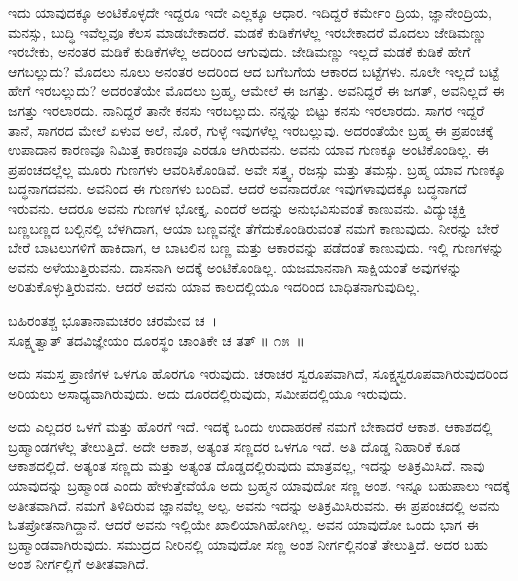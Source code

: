 ಇದು ಯಾವುದಕ್ಕೂ ಅಂಟಿಕೊಳ್ಳದೇ ಇದ್ದರೂ ಇದೇ ಎಲ್ಲಕ್ಕೂ ಆಧಾರ. ಇದಿದ್ದರೆ ಕರ್ಮೇಂ ದ್ರಿಯ, ಜ್ಞಾನೇಂದ್ರಿಯ, ಮನಸ್ಸು, ಬುದ್ಧಿ ಇವೆಲ್ಲವೂ ಕೆಲಸ ಮಾಡಬೇಕಾದರೆ. ಮಡಕೆ ಕುಡಿಕೆಗಳೆಲ್ಲ ಇರಬೇಕಾದರೆ ಮೊದಲು ಜೇಡಿಮಣ್ಣು ಇರಬೇಕು, ಅನಂತರ ಮಡಿಕೆ ಕುಡಿಕೆಗಳೆಲ್ಲ ಅದರಿಂದ ಆಗುವುದು. ಜೇಡಿಮಣ್ಣು ಇಲ್ಲದೆ ಮಡಕೆ ಕುಡಿಕೆ ಹೇಗೆ ಆಗಬಲ್ಲುದು? ಮೊದಲು ನೂಲು ಅನಂತರ ಅದರಿಂದ ಆದ ಬಗೆಬಗೆಯ ಆಕಾರದ ಬಟ್ಟೆಗಳು. ನೂಲೇ ಇಲ್ಲದೆ ಬಟ್ಟೆ ಹೇಗೆ ಇರಬಲ್ಲುದು? ಅದರಂತೆಯೇ ಮೊದಲು ಬ್ರಹ್ಮ, ಆಮೇಲೆ ಈ ಜಗತ್ತು. ಅವನಿದ್ದರೆ ಈ ಜಗತ್, ಅವನಿಲ್ಲದೆ ಈ ಜಗತ್ತು ಇರಲಾರದು. ನಾನಿದ್ದರೆ ತಾನೇ ಕನಸು ಇರಬಲ್ಲುದು. ನನ್ನನ್ನು ಬಿಟ್ಟು ಕನಸು ಇರಲಾರದು. ಸಾಗರ ಇದ್ದರೆ ತಾನೆ, ಸಾಗರದ ಮೇಲೆ ಏಳುವ ಅಲೆ, ನೊರೆ, ಗುಳ್ಳೆ ಇವುಗಳೆಲ್ಲ ಇರಬಲ್ಲುವು. ಅದರಂತೆಯೇ ಬ್ರಹ್ಮ ಈ ಪ್ರಪಂಚಕ್ಕೆ ಉಪಾದಾನ ಕಾರಣವೂ ನಿಮಿತ್ತ ಕಾರಣವೂ ಎರಡೂ ಆಗಿರುವನು. ಅವನು ಯಾವ ಗುಣಕ್ಕೂ ಅಂಟಿಕೊಂಡಿಲ್ಲ. ಈ ಪ್ರಪಂಚದಲ್ಲೆಲ್ಲ ಮೂರು ಗುಣಗಳು ಆವರಿಸಿಕೊಂಡಿವೆ. ಅವೇ ಸತ್ತ್ವ, ರಜಸ್ಸು ಮತ್ತು ತಮಸ್ಸು. ಬ್ರಹ್ಮ ಯಾವ ಗುಣಕ್ಕೂ ಬದ್ಧನಾಗದವನು. ಅವನಿಂದ ಈ ಗುಣಗಳು ಬಂದಿವೆ. ಆದರೆ ಅವನಾದರೋ ಇವುಗಳಾವುದಕ್ಕೂ ಬದ್ಧನಾಗದೆ ಇರುವನು. ಆದರೂ ಅವನು ಗುಣಗಳ ಭೋಕ್ತೃ. ಎಂದರೆ ಅದನ್ನು ಅನುಭವಿಸುವಂತೆ ಕಾಣುವನು. ವಿದ್ಯುಚ್ಛಕ್ತಿ ಬಣ್ಣಬಣ್ಣದ ಬಲ್ಬಿನಲ್ಲಿ ಬೆಳಗಿದಾಗ, ಆಯಾ ಬಣ್ಣವನ್ನೇ ತೆಗೆದುಕೊಂಡಿರುವಂತೆ ನಮಗೆ ಕಾಣುವುದು. ನೀರನ್ನು ಬೇರೆ ಬೇರೆ ಬಾಟಲುಗಳಿಗೆ ಹಾಕಿದಾಗ, ಆ ಬಾಟಲಿನ ಬಣ್ಣ ಮತ್ತು ಆಕಾರವನ್ನು ಪಡೆದಂತೆ ಕಾಣುವುದು. ಇಲ್ಲಿ ಗುಣಗಳನ್ನು ಅವನು ಅಳೆಯುತ್ತಿರುವನು. ದಾಸನಾಗಿ ಅದಕ್ಕೆ ಅಂಟಿಕೊಂಡಿಲ್ಲ. ಯಜಮಾನನಾಗಿ ಸಾಕ್ಷಿಯಂತೆ ಅವುಗಳನ್ನು ಅರಿತುಕೊಳ್ಳುತ್ತಿರುವನು. ಆದರೆ ಅವನು ಯಾವ ಕಾಲದಲ್ಲಿಯೂ ಇದರಿಂದ ಬಾಧಿತನಾಗುವುದಿಲ್ಲ.

\begin{shloka}
ಬಹಿರಂತಶ್ಚ ಭೂತಾನಾಮಚರಂ ಚರಮೇವ ಚ~।\\ಸೂಕ್ಷ್ಮತ್ವಾತ್ ತದವಿಜ್ಞೇಯಂ ದೂರಸ್ಥಂ ಚಾಂತಿಕೇ ಚ ತತ್ \hfill॥ ೧೫~॥
\end{shloka}

\begin{artha}
ಅದು ಸಮಸ್ತ ಪ್ರಾಣಿಗಳ ಒಳಗೂ ಹೊರಗೂ ಇರುವುದು. ಚರಾಚರ ಸ್ವರೂಪವಾಗಿದೆ, ಸೂಕ್ಷ್ಮ\-ಸ್ವರೂಪ\-ವಾಗಿರುವುದರಿಂದ ಅರಿಯಲು ಅಸಾಧ್ಯವಾಗಿರುವುದು. ಅದು ದೂರದಲ್ಲಿರುವುದು, ಸಮೀಪ\-ದಲ್ಲಿಯೂ ಇರುವುದು.
\end{artha}

ಅದು ಎಲ್ಲದರ ಒಳಗೆ ಮತ್ತು ಹೊರಗೆ ಇದೆ. ಇದಕ್ಕೆ ಒಂದು ಉದಾಹರಣೆ ನಮಗೆ ಬೇಕಾದರೆ ಆಕಾಶ. ಆಕಾಶದಲ್ಲಿ ಬ್ರಹ್ಮಾಂಡಗಳೆಲ್ಲ ತೇಲುತ್ತಿದೆ. ಅದೇ ಆಕಾಶ, ಅತ್ಯಂತ ಸಣ್ಣದರ ಒಳಗೂ ಇದೆ. ಅತಿ ದೊಡ್ಡ ನಿಹಾರಿಕೆ ಕೂಡ ಆಕಾಶದಲ್ಲಿದೆ. ಅತ್ಯಂತ ಸಣ್ಣದು ಮತ್ತು ಅತ್ಯಂತ ದೊಡ್ಡದಲ್ಲಿರುವುದು ಮಾತ್ರವಲ್ಲ, ಇದನ್ನು ಅತಿಕ್ರಮಿಸಿದೆ. ನಾವು ಯಾವುದನ್ನು ಬ್ರಹ್ಮಾಂಡ ಎಂದು ಹೇಳುತ್ತೇವೆಯೊ ಅದು ಬ್ರಹ್ಮನ ಯಾವುದೋ ಸಣ್ಣ ಅಂಶ. ಇನ್ನೂ ಬಹುಪಾಲು ಇದಕ್ಕೆ ಅತೀತವಾಗಿದೆ. ನಮಗೆ ತಿಳಿದಿರುವ ಜ್ಞಾನವೆಲ್ಲ ಅಲ್ಪ. ಅವನು ಇದನ್ನು ಅತಿಕ್ರಮಿಸಿರುವನು. ಈ ಪ್ರಪಂಚದಲ್ಲಿ ಅವನು ಓತಪ್ರೋತನಾಗಿದ್ದಾನೆ. ಆದರೆ ಅವನು ಇಲ್ಲಿಯೇ ಖಾಲಿಯಾಗಿಹೋಗಿಲ್ಲ. ಅವನ ಯಾವುದೋ ಒಂದು ಭಾಗ ಈ ಬ್ರಹ್ಮಾಂಡವಾಗಿರುವುದು. ಸಮುದ್ರದ ನೀರಿನಲ್ಲಿ ಯಾವುದೋ ಸಣ್ಣ ಅಂಶ ನೀರ್ಗಲ್ಲಿನಂತೆ  ತೇಲುತ್ತಿದೆ. ಅದರ ಬಹು ಅಂಶ ನೀರ್ಗಲ್ಲಿಗೆ ಅತೀತವಾಗಿದೆ.

\newpage

